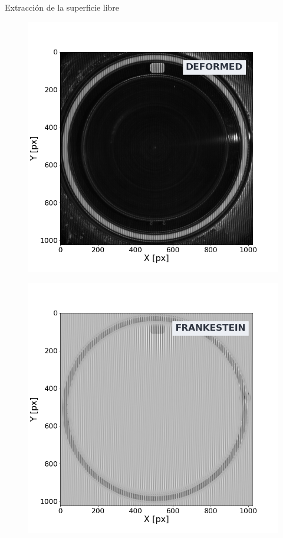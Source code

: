 \documentclass[aspectratio=169]{beamer}
\begin{document}
\begin{frame}{Extracción de la superficie libre} %
	\begin{minipage}{0.49\textwidth}
	  \begin{figure}
	    \includegraphics[width=\linewidth]{figs/ftp_deformed.png}
	  \end{figure}
	\end{minipage} \hfill
	\begin{minipage}{0.49\textwidth}
	  \begin{figure}
	    \includegraphics[width=\linewidth]{figs/ftp_hybrid.png}
	  \end{figure}
	\end{minipage}
\end{frame}
\end{document}
